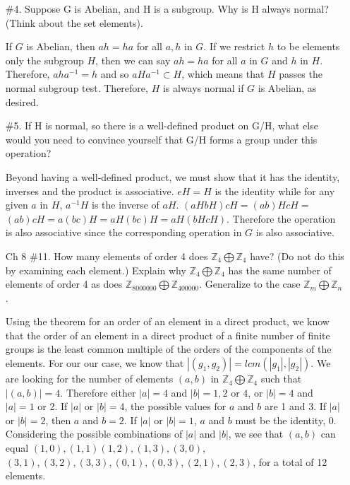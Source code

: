 \documentclass{article}
\newcommand{\Z}{\mathbb Z}
\begin{document}
\begin{enumerate}
    \item[\#4.]Suppose G is Abelian, and H is a subgroup. Why is H always normal? (Think about the set elements).
    
    \begin{flushleft}
    If $G$ is Abelian, then $ah = ha$ for all $a, h$ in $G$. If we restrict $h$ to be elements only the subgroup $H$, then we can say $ah = ha$ for all $a$ in $G$ and $h$ in $H$. Therefore, $aha^{-1} = h$ and so $aHa^{-1} \subset H$, which means that $H$ passes the normal subgroup test. Therefore, $H$ is always normal  if $G$ is Abelian, as desired.
    \end{flushleft}

    \item[\#5.]If H is normal, so there is a well-defined product on G/H, what else would you need to convince yourself that G/H forms a group under this operation?
    
    \begin{flushleft}
    Beyond having a well-defined product, we must show that it has the identity, inverses and the product is associative. $eH = H$ is the identity while for any given $a$ in $H$, $a^{-1}H$ is the inverse of $aH$. $(aHbH)cH = (ab)HcH =$ $(ab)cH = a(bc)H = aH(bc)H = aH(bHcH)$. Therefore the operation is also associative since the corresponding operation in $G$ is also associative.
    \end{flushleft}

    \item[Ch 8 \#11.]How many elements of order 4 does $\Z_4 \bigoplus \Z_4$ have? (Do not do this by examining each element.) Explain why $\Z_4 \bigoplus \Z_4$ has the same number of elements of order 4 as does $\Z_{8000000} \bigoplus \Z_{400000}$. Generalize to the case $\Z_m \bigoplus \Z_n$.
    
    \begin{flushleft}
    Using the theorem for an order of an element in a direct product, we know that the order of an element in a direct product of a finite number of finite groups is the least common multiple of the orders of the components of the elements. For our our case, we know that $|(g_1, g_2)| = lcm(|g_1|,|g_2|)$. We are looking for the number of elements $(a,b)$ in $\Z_4 \bigoplus \Z_4$ such that $|(a,b)| = 4$. Therefore either $|a| = 4$ and $|b| = 1, 2$ or $4$, or $|b| = 4$ and $|a| = 1$ or 2. If $|a|$ or $|b| =  4$, the possible values for $a$ and $b$ are 1 and 3. If $|a|$ or $|b| =  2$, then $a$ and $b = 2$. If $|a|$ or $|b| =  1$, $a$ and $b$ must be the identity, 0. Considering the possible combinations of $|a|$ and $|b|$, we see that $(a,b)$ can equal $(1,0), (1,1) (1,2), (1,3), (3,0)$, $ (3,1), (3,2), (3,3), (0,1), (0,3), (2,1), (2,3)$, for a total of 12 elements.
    \newline
    

\end{flushleft}
\end{enumerate}
\end{document}
